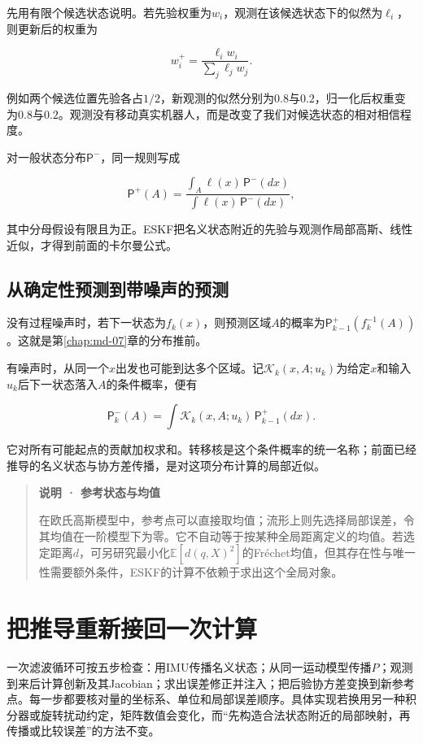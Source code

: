 先用有限个候选状态说明。若先验权重为$w_i$，观测在该候选状态下的似然为$\ell_i$，则更新后的权重为

\begin{equation*}
w_i^+=\frac{\ell_iw_i}{\sum_j\ell_jw_j}.
\end{equation*}

例如两个候选位置先验各占$1/2$，新观测的似然分别为$0.8$与$0.2$，归一化后权重变为$0.8$与$0.2$。观测没有移动真实机器人，而是改变了我们对候选状态的相对相信程度。

对一般状态分布$\mathsf P^-$，同一规则写成

\begin{equation*}
\mathsf P^+(A)
 =\frac{\int_A\ell(x)\,\mathsf P^-(dx)}
        {\int\ell(x)\,\mathsf P^-(dx)},
\end{equation*}

其中分母假设有限且为正。ESKF把名义状态附近的先验与观测作局部高斯、线性近似，才得到前面的卡尔曼公式。

\subsection{从确定性预测到带噪声的预测}

没有过程噪声时，若下一状态为$f_k(x)$，则预测区域$A$的概率为$\mathsf P_{k-1}^+(f_k^{-1}(A))$。这就是第\ref{chap:md-07}章的分布推前。

有噪声时，从同一个$x$出发也可能到达多个区域。记$\mathcal K_k(x,A;u_k)$为给定$x$和输入$u_k$后下一状态落入$A$的条件概率，便有

\begin{equation*}
\mathsf P_k^-(A)=\int\mathcal K_k(x,A;u_k)\,\mathsf P_{k-1}^+(dx).
\end{equation*}

它对所有可能起点的贡献加权求和。转移核是这个条件概率的统一名称；前面已经推导的名义状态与协方差传播，是对这项分布计算的局部近似。

\begin{quote}\textbf{说明 · 参考状态与均值}\par

在欧氏高斯模型中，参考点可以直接取均值；流形上则先选择局部误差，令其均值在一阶模型下为零。它不自动等于按某种全局距离定义的均值。若选定距离$d$，可另研究最小化$\mathbb E[d(q,X)^2]$的Fréchet均值，但其存在性与唯一性需要额外条件，ESKF的计算不依赖于求出这个全局对象。

\end{quote}

\section{把推导重新接回一次计算}

一次滤波循环可按五步检查：用IMU传播名义状态；从同一运动模型传播$P$；观测到来后计算创新及其Jacobian；求出误差修正并注入；把后验协方差变换到新参考点。每一步都要核对量的坐标系、单位和局部误差顺序。具体实现若换用另一种积分器或旋转扰动约定，矩阵数值会变化，而“先构造合法状态附近的局部映射，再传播或比较误差”的方法不变。
